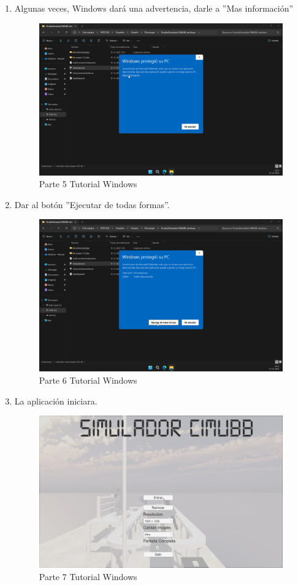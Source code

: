 \begin{enumerate}[label=\arabic*.-]
    \item Algunas veces, Windows dará una advertencia, darle a ''Mas información''
\begin{figure}[ht]
    \centering
    \includegraphics[width=10.5cm]{figures/TutorialWindows/tutorial (10).png}
    \caption{Parte 5 Tutorial Windows}
    \label{fig:tutowin5}
\end{figure}
\clearpage

    \item Dar al botón ''Ejecutar de todas formas''.
\begin{figure}[ht]
    \centering
    \includegraphics[width=10.5cm]{figures/TutorialWindows/tutorial (11).png}
    \caption{Parte 6 Tutorial Windows}
    \label{fig:tutowin6}
\end{figure}

    \item La aplicación iniciara.
\begin{figure}[ht]
    \centering
    \includegraphics[width=10.5cm]{figures/TutorialWindows/tutorial (12).png}
    \caption{Parte 7 Tutorial Windows}
    \label{fig:tutowin7}
\end{figure}
\end{enumerate}
\clearpage

